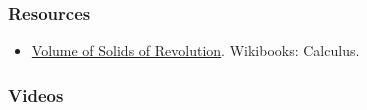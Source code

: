 \subsubsection{Resources}
\label{sss:reso-55b5}

\begin{itemize}
\item \href{https://en.wikibooks.org/wiki/Calculus/Volume_of_solids_of_revolution}{Volume of Solids of Revolution}.  
Wikibooks: Calculus.
\end{itemize}

\subsubsection{Videos}
\label{sss:vide-cce3}

